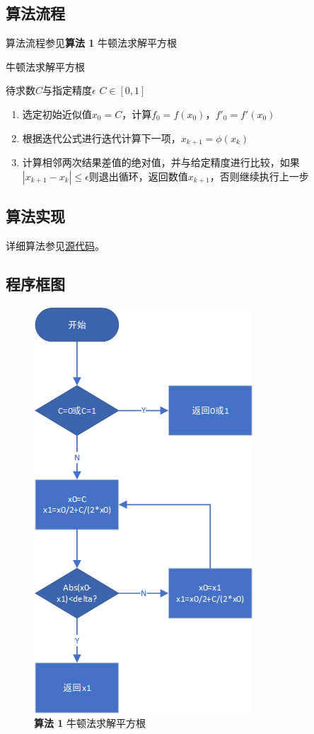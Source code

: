 \documentclass[lang=cn,11pt,a4paper]{elegantpaper}
\begin{document}
\subsection{算法流程}
算法流程参见\textbf{算法 1} 牛顿法求解平方根
\begin{algorithm}
  \caption{牛顿法求解平方根}
  \begin{algorithmic}
    \Require 待求数$C$与指定精度$\epsilon$
    \Ensure $C\in [0,1]$
    \begin{enumerate}
      \item 选定初始近似值$x_0=C$，计算$f_0=f(x_0)$，$f'_0=f'(x_0)$
      \item 根据迭代公式进行迭代计算下一项，$x_{k+1}=\phi(x_k)$
      \item 计算相邻两次结果差值的绝对值，并与给定精度进行比较，如果$|x_{k+1}-x_k|\leq \epsilon$则退出循环，返回数值$x_{k+1}$，否则继续执行上一步
    \end{enumerate}
  \end{algorithmic}
\end{algorithm}
\subsection{算法实现}
详细算法参见\href{https://github.com/Antonio-Chan/SineCalculate}{源代码}。
\subsection{程序框图}
\begin{figure}[htbp]
    \centering
    \includegraphics[width=0.45\linewidth]{src/A.png}
    \centering
    \caption{\textbf{算法 1} 牛顿法求解平方根}
\end{figure}
\end{document}
